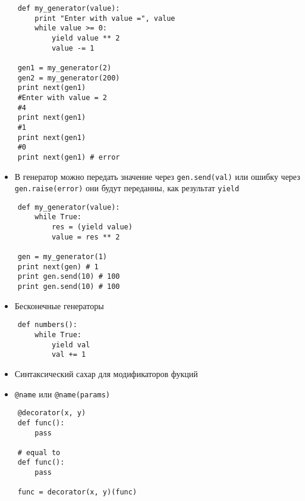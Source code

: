 \documentclass{article}
\begin{document}
\vspace{15pt}
\begin{lstlisting}
	def my_generator(value):
	    print "Enter with value =", value
	    while value >= 0:
	        yield value ** 2
	        value -= 1

	gen1 = my_generator(2)
	gen2 = my_generator(200)
	print next(gen1) 
	#Enter with value = 2
	#4
	print next(gen1)
	#1
	print next(gen1)
	#0
	print next(gen1) # error
\end{lstlisting}
\newpage

\begin{itemize}
	\item В генератор можно передать значение через \lstinline!gen.send(val)!
		или ошибку через \lstinline!gen.raise(error)! они будут переданны, как 
		результат \lstinline!yield!
\end{itemize}
\vspace{15pt}
\begin{lstlisting}
	def my_generator(value):
	    while True:
	        res = (yield value)
	        value = res ** 2

	gen = my_generator(1)
	print next(gen) # 1
	print gen.send(10) # 100
	print gen.send(10) # 100
\end{lstlisting}
\newpage

\begin{itemize}
	\item Бесконечные генераторы
\end{itemize}
\vspace{15pt}
\begin{lstlisting}
	def numbers():
	    while True:
	        yield val
	        val += 1
\end{lstlisting}
\newpage

\newpage

\begin{itemize}
	\item Синтаксический сахар для модификаторов фукций
	\item \lstinline!@name! или \lstinline!@name(params)!
\end{itemize}
\vspace{15pt}
\begin{lstlisting}
	@decorator(x, y)
	def func():
		pass

	# equal to
	def func():
		pass

	func = decorator(x, y)(func)
\end{lstlisting}
\newpage
\end{document}
